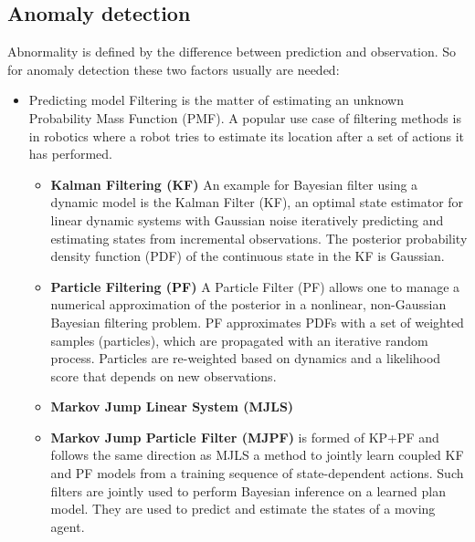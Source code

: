 \documentclass{article}
\begin{document}
		\subsection{Anomaly detection}
			Abnormality is defined by the difference between prediction and observation. So for anomaly detection these two factors usually are needed:
			\begin{itemize}
				\item Predicting model
					Filtering is the matter of estimating an unknown Probability Mass Function (PMF). A popular use case of filtering methods is in robotics where a robot tries to estimate its location after a set of actions it has performed.
					\begin{itemize}
						\item \textbf{Kalman Filtering (KF)} \cite{simon-2010-kalman-filtering-with-state-constraints-a-survey-of-linear-and-nonlinear-algorithms}
						An example for Bayesian filter using a dynamic model is the Kalman Filter (KF), an optimal state estimator for linear
						dynamic systems with Gaussian noise iteratively predicting and estimating states from incremental observations. The
						posterior probability density function (PDF) of the continuous state in the KF is Gaussian.
						\item \textbf{Particle Filtering (PF)} \cite{gustafsson-2010-particle-filter-theory-and-practice-with-positioning-applications}
						A Particle Filter (PF) allows one
						to manage a numerical approximation of the posterior in a
						nonlinear, non-Gaussian Bayesian filtering problem. PF
						approximates PDFs with a set of weighted samples (particles),
						which are propagated with an iterative random process. Particles are re-weighted based on dynamics and a likelihood score
						that depends on new observations.
						\item \textbf{Markov Jump Linear System (MJLS)} \cite{doucet-2001-particle-filters-for-state-estimation-of-jump-markov-linear-systems}
						\item \textbf{Markov Jump Particle Filter (MJPF)} is formed of KP+PF and follows the same direction as MJLS
							\cite{baydoun-2018-learning-switching-models-for-abnormality-detection-for-autonomous-driving}
							a method to jointly learn coupled
							KF and PF models from a training sequence of state-dependent
							actions. Such filters are jointly used to perform Bayesian
							inference on a learned plan model. They are used to predict
							and estimate the states of a moving agent.
					\end{itemize}

\end{itemize}
\end{document}
